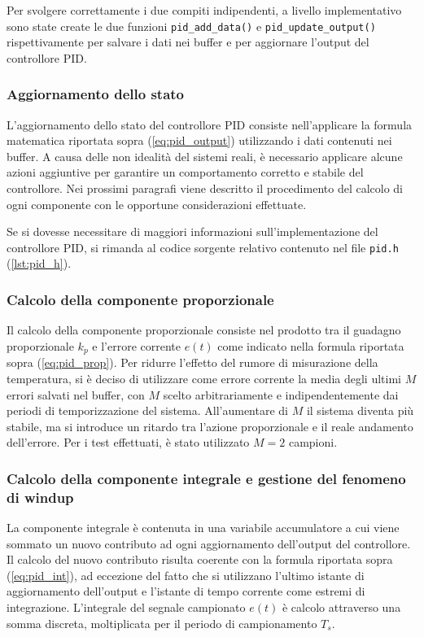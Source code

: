 Per svolgere correttamente i due compiti indipendenti, a livello implementativo sono state create le due funzioni
\verb|pid_add_data()| e \verb|pid_update_output()| rispettivamente per salvare i dati nei buffer e per aggiornare
l'output del controllore PID.

\subsubsection{Aggiornamento dello stato}
L'aggiornamento dello stato del controllore PID consiste nell'applicare la formula matematica riportata sopra (\autoref{eq:pid_output})
utilizzando i dati contenuti nei buffer. A causa delle non idealità del sistemi reali, è necessario applicare alcune azioni
aggiuntive per garantire un comportamento corretto e stabile del controllore. Nei prossimi paragrafi viene descritto il procedimento
del calcolo di ogni componente con le opportune considerazioni effettuate.

Se si dovesse necessitare di maggiori informazioni sull'implementazione del controllore PID, si rimanda al codice sorgente relativo
contenuto nel file \verb|pid.h| (\autoref{lst:pid_h}).

\subsubsection{Calcolo della componente proporzionale}
Il calcolo della componente proporzionale consiste nel prodotto tra il guadagno proporzionale \(k_p\) e l'errore corrente \(e(t)\)
come indicato nella formula riportata sopra (\autoref{eq:pid_prop}). Per ridurre l'effetto del rumore di misurazione della temperatura,
si è deciso di utilizzare come errore corrente la media degli ultimi \(M\) errori salvati nel buffer, con \(M\) scelto arbitrariamente
e indipendentemente dai periodi di temporizzazione del sistema. All'aumentare di \(M\) il sistema diventa più stabile, ma si introduce
un ritardo tra l'azione proporzionale e il reale andamento dell'errore. Per i test effettuati, è stato utilizzato \(M=2\) campioni.

\subsubsection{Calcolo della componente integrale e gestione del fenomeno di windup}
La componente integrale è contenuta in una variabile accumulatore a cui viene sommato un nuovo contributo ad ogni aggiornamento
dell'output del controllore. Il calcolo del nuovo contributo risulta coerente con la formula riportata sopra (\autoref{eq:pid_int}),
ad eccezione del fatto che si utilizzano l'ultimo istante di aggiornamento dell'output e l'istante di tempo corrente come estremi
di integrazione. L'integrale del segnale campionato \(e(t)\) è calcolo attraverso una somma discreta, moltiplicata per il periodo
di campionamento \(T_s\).


